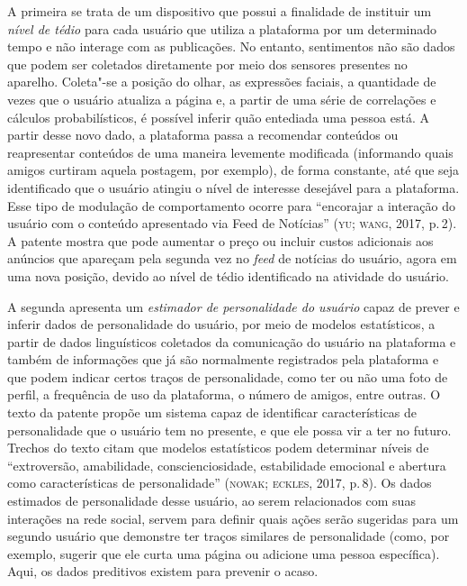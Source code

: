 A primeira se trata de um dispositivo que possui a finalidade de
instituir um \textit{nível de tédio} para cada usuário que utiliza a
plataforma por um determinado tempo e não interage com as publicações.
No entanto, sentimentos não são dados que podem ser coletados
diretamente por meio dos sensores presentes no aparelho. Coleta"-se a
posição do olhar, as expressões faciais, a quantidade de vezes que o
usuário atualiza a página e, a partir de uma série de correlações e
cálculos probabilísticos, é possível inferir quão entediada uma pessoa
está. A partir desse novo dado, a plataforma passa a recomendar
conteúdos ou reapresentar conteúdos de uma maneira levemente modificada
(informando quais amigos curtiram aquela postagem, por exemplo), de
forma constante, até que seja identificado que o usuário atingiu o nível
de interesse desejável para a plataforma. Esse tipo de modulação de
comportamento ocorre para ``encorajar a interação do usuário com o
conteúdo apresentado via Feed de Notícias'' (\textsc{yu; wang}, 2017, p.\,2). A
patente mostra que pode aumentar o preço ou incluir custos adicionais
aos anúncios que apareçam pela segunda vez no \textit{feed} de notícias do usuário,
agora em uma nova posição, devido ao nível de tédio identificado na
atividade do usuário.

A segunda apresenta um \textit{estimador de personalidade do usuário} capaz
de prever e inferir dados de personalidade do usuário, por meio de
modelos estatísticos, a partir de dados linguísticos coletados da
comunicação do usuário na plataforma e também de informações que já são
normalmente registrados pela plataforma e que podem indicar certos
traços de personalidade, como ter ou não uma foto de perfil, a
frequência de uso da plataforma, o número de amigos, entre outras. O
texto da patente propõe um sistema capaz de identificar características
de personalidade que o usuário tem no presente, e que ele possa vir a
ter no futuro. Trechos do texto citam que modelos estatísticos podem
determinar níveis de ``extroversão, amabilidade, conscienciosidade,
estabilidade emocional e abertura como características de
personalidade'' (\textsc{nowak; eckles}, 2017, p.\,8). Os dados estimados de
personalidade desse usuário, ao serem relacionados com suas interações
na rede social, servem para definir quais ações serão sugeridas para um
segundo usuário que demonstre ter traços similares de personalidade
(como, por exemplo, sugerir que ele curta uma página ou adicione uma
pessoa específica). Aqui, os dados preditivos existem para prevenir o
acaso.

